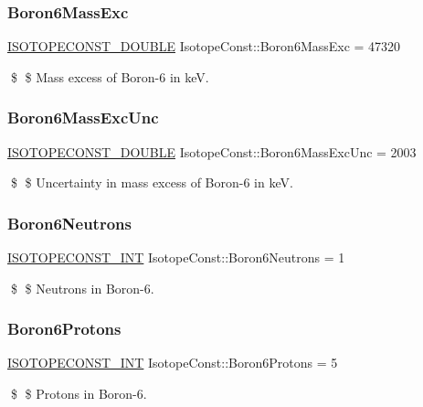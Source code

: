 \subsubsection{\texorpdfstring{Boron6\+Mass\+Exc}{Boron6MassExc}}
{\footnotesize\ttfamily \mbox{\hyperlink{group___isotope_const-_macros_ga8f45a7272ce02c0b4c65c44636ed719a}{I\+S\+O\+T\+O\+P\+E\+C\+O\+N\+S\+T\+\_\+\+D\+O\+U\+B\+LE}} Isotope\+Const\+::\+Boron6\+Mass\+Exc = 47320}

\$ \$ Mass excess of Boron-\/6 in keV. \mbox{\label{group___isotope_const-_boron-_b6_ga5305b6c6cdfe235a0eb50522cfba7804}} 
\subsubsection{\texorpdfstring{Boron6\+Mass\+Exc\+Unc}{Boron6MassExcUnc}}
{\footnotesize\ttfamily \mbox{\hyperlink{group___isotope_const-_macros_ga8f45a7272ce02c0b4c65c44636ed719a}{I\+S\+O\+T\+O\+P\+E\+C\+O\+N\+S\+T\+\_\+\+D\+O\+U\+B\+LE}} Isotope\+Const\+::\+Boron6\+Mass\+Exc\+Unc = 2003}

\$ \$ Uncertainty in mass excess of Boron-\/6 in keV. \mbox{\label{group___isotope_const-_boron-_b6_ga2dc2e091406c49beec5ef00bf5fd0fab}} 
\subsubsection{\texorpdfstring{Boron6\+Neutrons}{Boron6Neutrons}}
{\footnotesize\ttfamily \mbox{\hyperlink{group___isotope_const-_macros_ga5f18360b3e99483a35c32d789e62621c}{I\+S\+O\+T\+O\+P\+E\+C\+O\+N\+S\+T\+\_\+\+I\+NT}} Isotope\+Const\+::\+Boron6\+Neutrons = 1}

\$ \$ Neutrons in Boron-\/6. \mbox{\label{group___isotope_const-_boron-_b6_gaf130547f44eda547f4ca25c7e5bb85b2}} 
\subsubsection{\texorpdfstring{Boron6\+Protons}{Boron6Protons}}
{\footnotesize\ttfamily \mbox{\hyperlink{group___isotope_const-_macros_ga5f18360b3e99483a35c32d789e62621c}{I\+S\+O\+T\+O\+P\+E\+C\+O\+N\+S\+T\+\_\+\+I\+NT}} Isotope\+Const\+::\+Boron6\+Protons = 5}

\$ \$ Protons in Boron-\/6. 